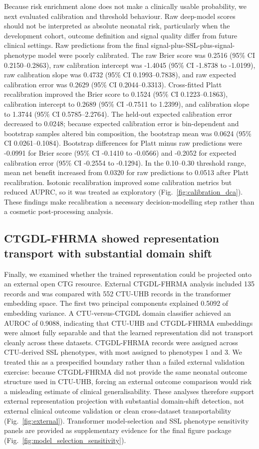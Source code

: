 \documentclass[pdflatex,sn-nature]{sn-jnl}
\begin{document}
Because risk enrichment alone does not make a clinically usable probability, we next evaluated calibration and threshold behaviour. Raw deep-model scores should not be interpreted as absolute neonatal risk, particularly when the development cohort, outcome definition and signal quality differ from future clinical settings. Raw predictions from the final signal-plus-SSL-plus-signal-phenotype model were poorly calibrated. The raw Brier score was 0.2516 (95\% CI 0.2150--0.2863), raw calibration intercept was -1.4045 (95\% CI -1.8738 to -1.0199), raw calibration slope was 0.4732 (95\% CI 0.1993--0.7838), and raw expected calibration error was 0.2629 (95\% CI 0.2044--0.3313). Cross-fitted Platt recalibration improved the Brier score to 0.1524 (95\% CI 0.1223--0.1863), calibration intercept to 0.2689 (95\% CI -0.7511 to 1.2399), and calibration slope to 1.3744 (95\% CI 0.5785--2.2764). The held-out expected calibration error decreased to 0.0248; because expected calibration error is bin-dependent and bootstrap samples altered bin composition, the bootstrap mean was 0.0624 (95\% CI 0.0261--0.1084). Bootstrap differences for Platt minus raw predictions were -0.0991 for Brier score (95\% CI -0.1410 to -0.0566) and -0.2052 for expected calibration error (95\% CI -0.2554 to -0.1294). In the 0.10--0.30 threshold range, mean net benefit increased from 0.0320 for raw predictions to 0.0513 after Platt recalibration. Isotonic recalibration improved some calibration metrics but reduced AUPRC, so it was treated as exploratory (Fig.~\ref{fig:calibration_dca}). These findings make recalibration a necessary decision-modelling step rather than a cosmetic post-processing analysis.

\subsection{CTGDL-FHRMA showed representation transport with substantial domain shift}

Finally, we examined whether the trained representation could be projected onto an external open CTG resource. External CTGDL-FHRMA analysis included 135 records and was compared with 552 CTU-UHB records in the transformer embedding space. The first two principal components explained 0.5092 of embedding variance. A CTU-versus-CTGDL domain classifier achieved an AUROC of 0.9088, indicating that CTU-UHB and CTGDL-FHRMA embeddings were almost fully separable and that the learned representation did not transport cleanly across these datasets. CTGDL-FHRMA records were assigned across CTU-derived SSL phenotypes, with most assigned to phenotypes 1 and 3. We treated this as a prespecified boundary rather than a failed external validation exercise: because CTGDL-FHRMA did not provide the same neonatal outcome structure used in CTU-UHB, forcing an external outcome comparison would risk a misleading estimate of clinical generalisability. These analyses therefore support external representation projection with substantial domain-shift detection, not external clinical outcome validation or clean cross-dataset transportability (Fig.~\ref{fig:external}). Transformer model-selection and SSL phenotype sensitivity panels are provided as supplementary evidence for the final figure package (Fig.~\ref{fig:model_selection_sensitivity}).
\end{document}
